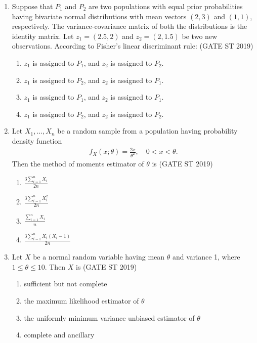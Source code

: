 \documentclass[journal]{IEEEtran}
\begin{document}
\begin{enumerate}[start=1]
\item Suppose that \(P_1\) and \(P_2\) are two populations with equal prior probabilities having bivariate normal distributions with mean vectors \((2,3)\) and \((1,1)\), respectively. The variance-covariance matrix of both the distributions is the identity matrix. Let \(z_1 = (2.5, 2)\) and \(z_2 = (2, 1.5)\) be two new observations. According to Fisher's linear discriminant rule: \hfill(GATE ST 2019)
\begin{enumerate}
\item \(z_1\) is assigned to \(P_1\), and \(z_2\) is assigned to \(P_2\).
\item \(z_1\) is assigned to \(P_2\), and \(z_2\) is assigned to \(P_1\).
\item \(z_1\) is assigned to \(P_1\), and \(z_2\) is assigned to \(P_1\).
\item \(z_1\) is assigned to \(P_2\), and \(z_2\) is assigned to \(P_2\).
\end{enumerate}



\item Let \(X_1, \ldots, X_n\) be a random sample from a population having probability density function
\begin{align*}
f_X(x; \theta) = \frac{2x}{\theta^2}, \quad 0 < x < \theta.
\end{align*}
Then the method of moments estimator of \(\theta\) is \hfill(GATE ST 2019)
\begin{multicols}{4}
\begin{enumerate}
\item \(\frac{3 \sum_{i=1}^n X_i}{2n}\)
\item \(\frac{3 \sum_{i=1}^n X_i^2}{2n}\)
\item \(\frac{\sum_{i=1}^n X_i}{n}\)
\item \(\frac{3 \sum_{i=1}^n X_i (X_i -1)}{2n}\)
\end{enumerate}
\end{multicols}

\item Let \(X\) be a normal random variable having mean \(\theta\) and variance 1, where \(1 \leq \theta \leq 10\). Then \(X\) is \hfill(GATE ST 2019)
\begin{enumerate}
\item sufficient but not complete
\item the maximum likelihood estimator of \(\theta\)
\item the uniformly minimum variance unbiased estimator of \(\theta\)
\item complete and ancillary
\end{enumerate}


\end{enumerate}
\end{document}
